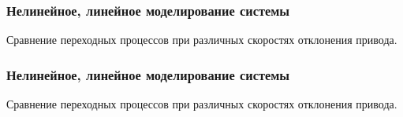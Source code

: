 \documentclass{beamer}
\begin{document}
\begin{frame}[t]
    \frametitle{Нелинейное, линейное моделирование системы}
    \begin{center}
        Сравнение переходных процессов при различных скоростях отклонения привода. 
        \vspace{14pt}

        \begin{minipage}{0.49\textwidth}
            \begin{center}
                \resizebox{1.0\textwidth}{!}{}
            \end{center}
        \end{minipage}
        \hfill
        \begin{minipage}{0.49\textwidth}
            \begin{center}
                \resizebox{1.0\textwidth}{!}{}
            \end{center}
        \end{minipage}
    \end{center}
\end{frame}


\begin{frame}[t]
    \frametitle{Нелинейное, линейное моделирование системы}
    \begin{center}
        Сравнение переходных процессов при различных скоростях отклонения привода. 
        \vspace{14pt}

        \begin{minipage}{0.49\textwidth}
            \begin{center}
                \resizebox{\textwidth}{!}{}
            \end{center}
        \end{minipage}
        \hfill
        \begin{minipage}{0.49\textwidth}
            \begin{center}
                \resizebox{\textwidth}{!}{}
            \end{center}
        \end{minipage}
    \end{center}
\end{frame}
\end{document}
